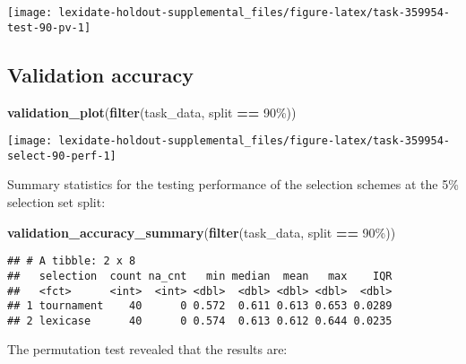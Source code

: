 \documentclass[
]{book}
\newenvironment{Shaded}{\begin{snugshade}}{\end{snugshade}}
\newcommand{\FunctionTok}[1]{\textcolor[rgb]{0.13,0.29,0.53}{\textbf{#1}}}
\newcommand{\NormalTok}[1]{#1}
\newcommand{\SpecialCharTok}[1]{\textcolor[rgb]{0.81,0.36,0.00}{\textbf{#1}}}
\newcommand{\StringTok}[1]{\textcolor[rgb]{0.31,0.60,0.02}{#1}}
\begin{document}
\texttt{[image: lexidate-holdout-supplemental\_files/figure-latex/task-359954-test-90-pv-1]}

\hypertarget{validation-accuracy-8}{%
\subsection{Validation accuracy}\label{validation-accuracy-8}}

\begin{Shaded}
\begin{Highlighting}[]
\FunctionTok{validation\_plot}\NormalTok{(}\FunctionTok{filter}\NormalTok{(task\_data, split }\SpecialCharTok{==} \StringTok{\textquotesingle{}90\%\textquotesingle{}}\NormalTok{))}
\end{Highlighting}
\end{Shaded}

\texttt{[image: lexidate-holdout-supplemental\_files/figure-latex/task-359954-select-90-perf-1]}

Summary statistics for the testing performance of the selection schemes at the 5\% selection set split:

\begin{Shaded}
\begin{Highlighting}[]
\FunctionTok{validation\_accuracy\_summary}\NormalTok{(}\FunctionTok{filter}\NormalTok{(task\_data, split }\SpecialCharTok{==} \StringTok{\textquotesingle{}90\%\textquotesingle{}}\NormalTok{))}
\end{Highlighting}
\end{Shaded}

\begin{verbatim}
## # A tibble: 2 x 8
##   selection  count na_cnt   min median  mean   max    IQR
##   <fct>      <int>  <int> <dbl>  <dbl> <dbl> <dbl>  <dbl>
## 1 tournament    40      0 0.572  0.611 0.613 0.653 0.0289
## 2 lexicase      40      0 0.574  0.613 0.612 0.644 0.0235
\end{verbatim}

The permutation test revealed that the results are:
\end{document}
